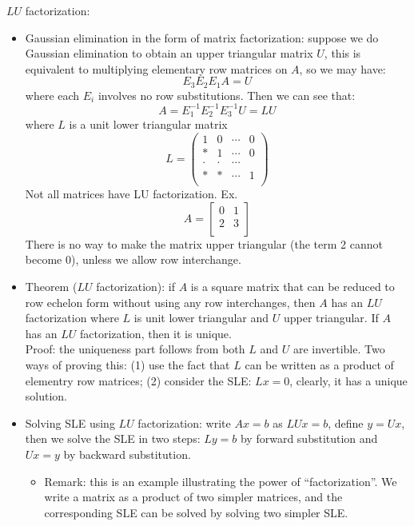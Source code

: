 \documentclass{report}
\begin{document}
$LU$ factorization:
\begin{itemize}
\item Gaussian elimination in the form of matrix factorization: suppose we do Gaussian elimination to obtain an upper triangular matrix $U$, this is equivalent to multiplying elementary row matrices on $A$, so we may have: 
\begin{equation}
E_3 E_2 E_1 A = U
\end{equation}
where each $E_i$ involves no row substitutions. Then we can see that: 
\begin{equation}
A = E_1^{-1} E_2^{-1} E_3^{-1} U = LU
\end{equation}
where $L$ is a unit lower triangular matrix
\begin{equation}
L = \left(
\begin{array}{llll}
1 & 0 & \cdots & 0\\
* & 1 & \cdots & 0\\
\cdot & \cdot & \cdots  \\
* & * & \cdots & 1\\
\end{array}
\right)	
\end{equation}
Not all matrices have LU factorization. Ex. 
\begin{equation}
A = \left[
\begin{array}{ll}
0 & 1\\
2 & 3 \\
\end{array}
\right]
\end{equation}
There is no way to make the matrix upper triangular (the term 2 cannot become 0), unless we allow row interchange. 

\item Theorem ($LU$ factorization): if $A$ is a square matrix that can be reduced to row echelon form without using any row interchanges, then $A$ has an $LU$ factorization where $L$ is unit lower triangular and $U$ upper triangular. If $A$ has an $LU$ factorization, then it is unique. \\
Proof: the uniqueness part follows from both $L$ and $U$ are invertible. Two ways of proving this: (1) use the fact that $L$ can be written as a product of elementry row matrices; (2) consider the SLE: $L x = 0$, clearly, it has a unique solution. 

\item Solving SLE using $LU$ factorization: write $Ax=b$ as $LUx = b$, define $y= Ux$, then we solve the SLE in two steps: $L y = b$ by forward substitution and $ Ux=y$ by backward substitution. 
\begin{itemize}
	\item Remark: this is an example illustrating the power of ``factorization''. We write a matrix as a product of two simpler matrices, and the corresponding SLE can be solved by solving two simpler SLE. 
\end{itemize}


\end{itemize}
\end{document}

